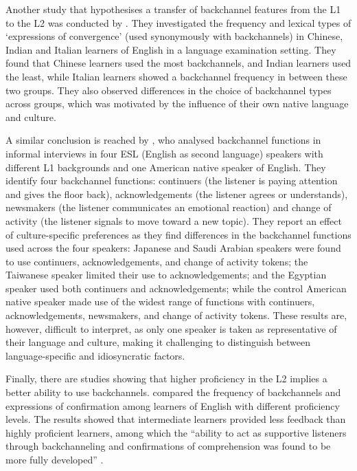 Another study that hypothesises a transfer of backchannel features from the L1 to the L2 was conducted by \citet{CastelloGesuato2019}. They investigated the frequency and lexical types of ‘expressions of convergence’ (used synonymously with backchannels) in Chinese, Indian and Italian learners of English in a language examination setting. They found that Chinese learners used the most backchannels, and Indian learners used the least, while Italian learners showed a backchannel frequency in between these two groups. They also observed differences in the choice of backchannel types across groups, which was motivated by the influence of their own native language and culture.

A similar conclusion is reached by \citet{ShelleyGonzalez2013}, who analysed backchannel functions in informal interviews in four ESL (English as second language) speakers with different L1 backgrounds and one American native speaker of English. They identify four backchannel functions: continuers (the listener is paying attention and gives the floor back), acknowledgements (the listener agrees or understands), newsmakers (the listener communicates an emotional reaction) and change of activity (the listener signals to move toward a new topic). They report an effect of culture-specific preferences as they find differences in the backchannel functions used across the four speakers: Japanese and Saudi Arabian speakers were found to use continuers, acknowledgements, and change of activity tokens; the Taiwanese speaker limited their use to acknowledgements; and the Egyptian speaker used both continuers and acknowledgements; while the control American native speaker made use of the widest range of functions with continuers, acknowledgements, newsmakers, and change of activity tokens. These results are, however, difficult to interpret, as only one speaker is taken as representative of their language and culture, making it challenging to distinguish between language-specific and idiosyncratic factors.

Finally, there are studies showing that higher proficiency in the L2 implies a better ability to use backchannels. \citet{Galaczi2014} compared the frequency of backchannels and expressions of confirmation among learners of English with different proficiency levels. The results showed that intermediate learners provided less feedback than highly proficient learners, among which the “ability to act as supportive listeners through backchanneling and confirmations of comprehension was found to be more fully developed” \citep[570]{Galaczi2014}.

